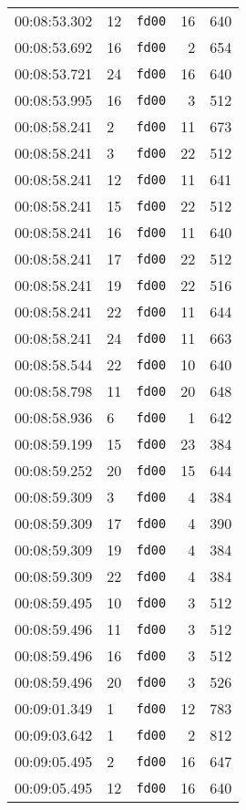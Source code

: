 \documentclass{article}
\begin{document}
\begin{longtable}{lllrr}
00:08:53.302 & 12 & \texttt{fd00} & 16 & 640 \\
00:08:53.692 & 16 & \texttt{fd00} & 2 & 654 \\
00:08:53.721 & 24 & \texttt{fd00} & 16 & 640 \\
00:08:53.995 & 16 & \texttt{fd00} & 3 & 512 \\
00:08:58.241 & 2 & \texttt{fd00} & 11 & 673 \\
00:08:58.241 & 3 & \texttt{fd00} & 22 & 512 \\
00:08:58.241 & 12 & \texttt{fd00} & 11 & 641 \\
00:08:58.241 & 15 & \texttt{fd00} & 22 & 512 \\
00:08:58.241 & 16 & \texttt{fd00} & 11 & 640 \\
00:08:58.241 & 17 & \texttt{fd00} & 22 & 512 \\
00:08:58.241 & 19 & \texttt{fd00} & 22 & 516 \\
00:08:58.241 & 22 & \texttt{fd00} & 11 & 644 \\
00:08:58.241 & 24 & \texttt{fd00} & 11 & 663 \\
00:08:58.544 & 22 & \texttt{fd00} & 10 & 640 \\
00:08:58.798 & 11 & \texttt{fd00} & 20 & 648 \\
00:08:58.936 & 6 & \texttt{fd00} & 1 & 642 \\
00:08:59.199 & 15 & \texttt{fd00} & 23 & 384 \\
00:08:59.252 & 20 & \texttt{fd00} & 15 & 644 \\
00:08:59.309 & 3 & \texttt{fd00} & 4 & 384 \\
00:08:59.309 & 17 & \texttt{fd00} & 4 & 390 \\
00:08:59.309 & 19 & \texttt{fd00} & 4 & 384 \\
00:08:59.309 & 22 & \texttt{fd00} & 4 & 384 \\
00:08:59.495 & 10 & \texttt{fd00} & 3 & 512 \\
00:08:59.496 & 11 & \texttt{fd00} & 3 & 512 \\
00:08:59.496 & 16 & \texttt{fd00} & 3 & 512 \\
00:08:59.496 & 20 & \texttt{fd00} & 3 & 526 \\
00:09:01.349 & 1 & \texttt{fd00} & 12 & 783 \\
00:09:03.642 & 1 & \texttt{fd00} & 2 & 812 \\
00:09:05.495 & 2 & \texttt{fd00} & 16 & 647 \\
00:09:05.495 & 12 & \texttt{fd00} & 16 & 640 \\

\end{longtable}
\end{document}
